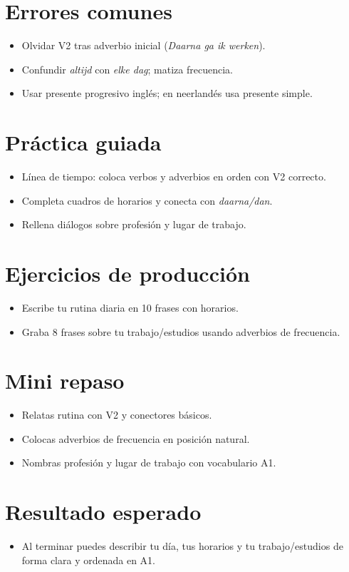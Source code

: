 \section{Errores comunes}
\begin{itemize}[leftmargin=*]
	\item Olvidar V2 tras adverbio inicial (\textit{Daarna ga ik werken}).
	\item Confundir \textit{altijd} con \textit{elke dag}; matiza frecuencia.
	\item Usar presente progresivo inglés; en neerlandés usa presente simple.
\end{itemize}

\section{Práctica guiada}
\begin{itemize}[leftmargin=*]
	\item Línea de tiempo: coloca verbos y adverbios en orden con V2 correcto.
	\item Completa cuadros de horarios y conecta con \textit{daarna/dan}.
	\item Rellena diálogos sobre profesión y lugar de trabajo.
\end{itemize}

\section{Ejercicios de producción}
\begin{itemize}[leftmargin=*]
	\item Escribe tu rutina diaria en 10 frases con horarios.
	\item Graba 8 frases sobre tu trabajo/estudios usando adverbios de frecuencia.
\end{itemize}

\section{Mini repaso}
\begin{itemize}[leftmargin=*]
	\item Relatas rutina con V2 y conectores básicos.
	\item Colocas adverbios de frecuencia en posición natural.
	\item Nombras profesión y lugar de trabajo con vocabulario A1.
\end{itemize}

\section{Resultado esperado}
\begin{itemize}[leftmargin=*]
	\item Al terminar puedes describir tu día, tus horarios y tu trabajo/estudios de forma clara y ordenada en A1.
\end{itemize}

